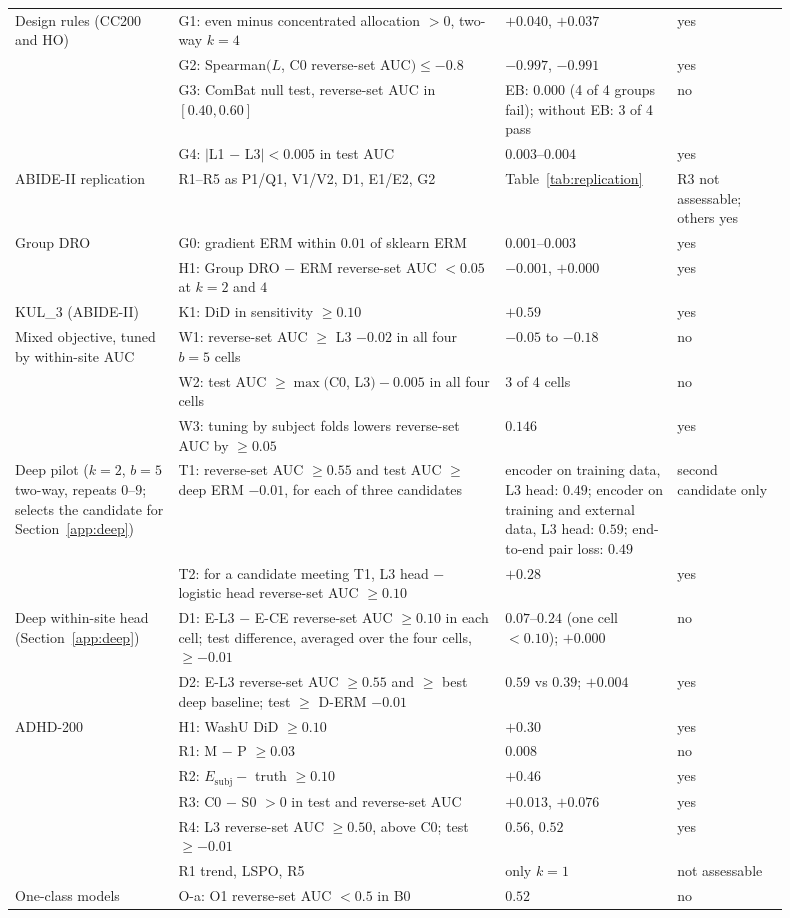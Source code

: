 {\begin{longtable}{>{\raggedright}p{0.19\linewidth}>{\raggedright}p{0.38\linewidth}>{\raggedright}p{0.2\linewidth}>{\raggedright\arraybackslash}p{0.13\linewidth}}
Design rules (CC200 and HO) & G1: even minus concentrated allocation $>0$, two-way $k=4$ & $+0.040$, $+0.037$ & yes\tabularnewline
 & G2: Spearman$(L$, C0 reverse-set AUC$)\le-0.8$ & $-0.997$, $-0.991$ & yes\tabularnewline
 & G3: ComBat null test, reverse-set AUC in $[0.40,0.60]$ & EB: $0.000$ (4 of 4 groups fail); without EB: 3 of 4 pass & no\tabularnewline
 & G4: $|$L1 $-$ L3$|<0.005$ in test AUC & $0.003$--$0.004$ & yes\tabularnewline
ABIDE-II replication & R1--R5 as P1/Q1, V1/V2, D1, E1/E2, G2 & Table~\ref{tab:replication} & R3 not assessable; others yes\tabularnewline
Group DRO & G0: gradient ERM within $0.01$ of sklearn ERM & $0.001$--$0.003$ & yes\tabularnewline
 & H1: Group DRO $-$ ERM reverse-set AUC $<0.05$ at $k=2$ and $4$ & $-0.001$, $+0.000$ & yes\tabularnewline
KUL\_3 (ABIDE-II) & K1: DiD in sensitivity $\ge0.10$ & $+0.59$ & yes\tabularnewline
Mixed objective, tuned by within-site AUC & W1: reverse-set AUC $\ge$ L3 $-0.02$ in all four $b=5$ cells & $-0.05$ to $-0.18$ & no\tabularnewline
 & W2: test AUC $\ge\max($C0, L3$)-0.005$ in all four cells & 3 of 4 cells & no\tabularnewline
 & W3: tuning by subject folds lowers reverse-set AUC by $\ge0.05$ & $0.146$ & yes\tabularnewline
Deep pilot ($k=2$, $b=5$ two-way, repeats $0$--$9$; selects the candidate for Section~\ref{app:deep}) & T1: reverse-set AUC $\ge0.55$ and test AUC $\ge$ deep ERM $-0.01$, for each of three candidates & encoder on training data, L3 head: $0.49$; encoder on training and external data, L3 head: $0.59$; end-to-end pair loss: $0.49$ & second candidate only\tabularnewline
 & T2: for a candidate meeting T1, L3 head $-$ logistic head reverse-set AUC $\ge0.10$ & $+0.28$ & yes\tabularnewline
Deep within-site head (Section~\ref{app:deep}) & D1: E-L3 $-$ E-CE reverse-set AUC $\ge0.10$ in each cell; test difference, averaged over the four cells, $\ge-0.01$ & $0.07$--$0.24$ (one cell $<0.10$); $+0.000$ & no\tabularnewline
 & D2: E-L3 reverse-set AUC $\ge0.55$ and $\ge$ best deep baseline; test $\ge$ D-ERM $-0.01$ & $0.59$ vs $0.39$; $+0.004$ & yes\tabularnewline
ADHD-200 & H1: WashU DiD $\ge0.10$ & $+0.30$ & yes\tabularnewline
 & R1: M $-$ P $\ge0.03$ & $0.008$ & no\tabularnewline
 & R2: $E_{\mathrm{subj}}-$ truth $\ge0.10$ & $+0.46$ & yes\tabularnewline
 & R3: C0 $-$ S0 $>0$ in test and reverse-set AUC & $+0.013$, $+0.076$ & yes\tabularnewline
 & R4: L3 reverse-set AUC $\ge0.50$, above C0; test $\ge-0.01$ & $0.56$, $0.52$ & yes\tabularnewline
 & R1 trend, LSPO, R5 & only $k=1$ & not assessable\tabularnewline
One-class models & O-a: O1 reverse-set AUC $<0.5$ in B0 & $0.52$ & no\tabularnewline

\end{longtable}}
